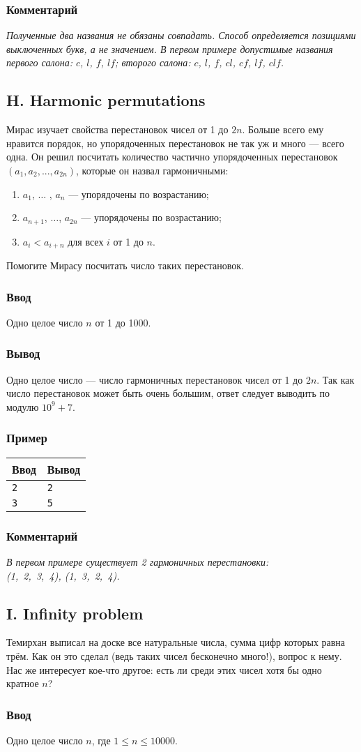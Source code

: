 \documentclass[10pt, a4paper]{article}
\newcommand{\informat}[1]
{
	\subsubsection*{Ввод} #1
}
\newcommand{\outformat}[1]
{
	\subsubsection*{Вывод} #1
}
\newcommand{\examplee}[4]
{
	\subsubsection*{Пример}
	\noindent
	\begin{center}
	\begin{tabularx}{\linewidth}{|X|X|}
	\hline
	Ввод 	& Вывод  	\\
	\hline
	{\tt #1} & {\tt #2}	\\
	\hline
	{\tt #3} & {\tt #4}	\\
	\hline
	\end{tabularx}
	\end{center}
}
\newcommand{\excomm}[1]
{
	\subsubsection*{Комментарий}
	\textit{#1}
}
\begin{document}
\excomm{Полученные два названия не обязаны совпадать. Способ определяется позициями выключенных букв, а не значением. В первом примере допустимые названия первого салона: $c$, $l$, $f$, $lf$; второго салона: $c$, $l$, $f$, $cl$, $cf$, $lf$, $clf$.}



\subsection*{H. Harmonic permutations}

Мирас изучает свойства перестановок чисел от 1 до $2n$. Больше всего ему нравится порядок, но упорядоченных перестановок не так уж и много --- всего одна. Он решил посчитать количество частично упорядоченных перестановок $(a_1, a_2, ..., a_{2n})$, которые он назвал гармоничными:

\begin{enumerate}
\item $a_1$, $\dots$ , $a_n$ --- упорядочены по возрастанию;
\item $a_{n+1}$, $\dots$, $a_{2n}$ --- упорядочены по возрастанию;
\item $a_i < a_{i+n}$ для всех $i$ от 1 до $n$.
\end{enumerate}

Помогите Мирасу посчитать число таких перестановок.

\informat{Одно целое число $n$ от 1 до 1000.}

\outformat{Одно целое число --- число гармоничных перестановок чисел от 1 до $2n$. Так как число перестановок может быть очень большим, ответ следует выводить по модулю $10^9 + 7$.}

\examplee{2}{2}{3}{5}

\excomm{В первом примере существует 2 гармоничных перестановки:\\ \mbox{(1, 2, 3, 4)}, \mbox{(1, 3, 2, 4)}.}



\subsection*{I. Infinity problem}

Темирхан выписал на доске все натуральные числа, сумма цифр которых равна трём. Как он это сделал (ведь таких чисел бесконечно много!), вопрос к нему. Нас же интересует кое-что другое: есть ли среди этих чисел хотя бы одно кратное $n$?

\informat{Одно целое число $n$, где $1 \le n \le 10 000$.}
\end{document}
